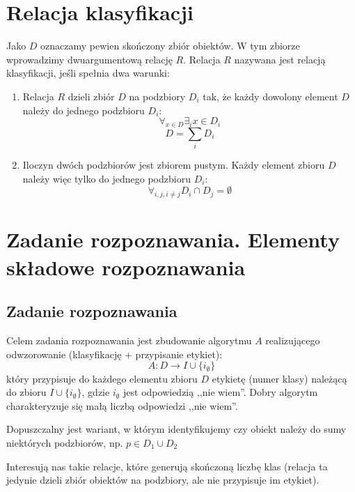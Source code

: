 \documentclass[a4paper,10pt]{article}
\begin{document}
\tableofcontents

\section{Relacja klasyfikacji}
Jako $D$ oznaczamy pewien skończony zbiór obiektów. W tym zbiorze wprowadzimy dwuargumentową relację $R$. Relacja $R$ nazywana jest relacją klasyfikacji, jeśli spełnia dwa warunki:
\begin{enumerate}
 \item Relacja $R$ dzieli zbiór $D$ na podzbiory $D_i$ tak, że każdy dowolony element $D$ należy do jednego podzbioru $D_i$:
\begin {equation}
 \displaystyle\mathop{\forall}_{x \in D} \mathop{\exists}_i x \in D_i
\end {equation}
\begin{equation}
 D = \sum_i D_i
\end{equation}
 \item Iloczyn dwóch podzbiorów jest zbiorem pustym. Każdy element zbioru $D$ należy więc tylko do jednego podzbioru $D_i$:
\begin{equation}
 \mathop{\forall}_{i, j, i \neq j} D_i \cap D_j = \emptyset
\end{equation}
\end{enumerate}

\section{Zadanie rozpoznawania. Elementy składowe rozpoznawania}
\subsection{Zadanie rozpoznawania}
Celem zadania rozpoznawania jest zbudowanie algorytmu $A$ realizującego odwzorowanie (klasyfikację + przypisanie etykiet):
\begin{equation}
 A : D \rightarrow I \cup \{i_{\emptyset}\}
\end{equation}
który przypisuje do każdego elementu zbioru $D$ etykietę (numer klasy) należącą do zbioru $I \cup \{i_{\emptyset}\}$, gdzie $i_{\emptyset}$ jest odpowiedzią ,,nie wiem''. Dobry algorytm charakteryzuje się małą liczbą odpowiedzi ,,nie wiem''.

Dopuszczalny jest wariant, w którym identyfikujemy czy obiekt należy do sumy niektórych podzbiorów, np. $p \in D_1 \cup D_2$

Interesują nas takie relacje, które generują skończoną liczbę klas (relacja ta jedynie dzieli zbiór obiektów na podzbiory, ale nie przypisuje im etykiet).
\end{document}
